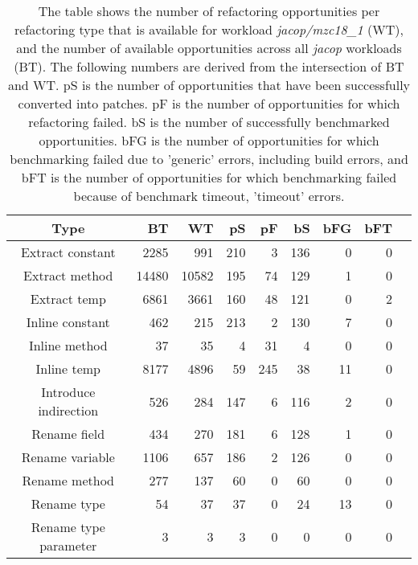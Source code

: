 \begin{table}[!h]
\caption{The table shows the number of refactoring opportunities per refactoring type that is available for workload \textit{jacop/mzc18\_1} (WT), and the number of available opportunities across all \textit{jacop} workloads (BT). The following numbers are derived from the intersection of BT and WT. pS is the number of opportunities that have been successfully converted into patches. pF is the number of opportunities for which refactoring failed. bS is the number of successfully benchmarked opportunities. bFG is the number of opportunities for which benchmarking failed due to 'generic' errors, including build errors, and bFT is the number of opportunities for which benchmarking failed because of benchmark timeout, 'timeout' errors.}
\begin{tabular}{c|*{7}{r}r}
Type&BT&WT&pS&pF&bS&bFG&bFT\\
\hline
Extract constant&2285&991&210&3&136&0&0\\
Extract method&14480&10582&195&74&129&1&0\\
Extract temp&6861&3661&160&48&121&0&2\\
Inline constant&462&215&213&2&130&7&0\\
Inline method&37&35&4&31&4&0&0\\
Inline temp&8177&4896&59&245&38&11&0\\
Introduce indirection&526&284&147&6&116&2&0\\
Rename field&434&270&181&6&128&1&0\\
Rename variable&1106&657&186&2&126&0&0\\
Rename method&277&137&60&0&60&0&0\\
Rename type&54&37&37&0&24&13&0\\
Rename type parameter&3&3&3&0&0&0&0\\
\end{tabular}
\end{table}

